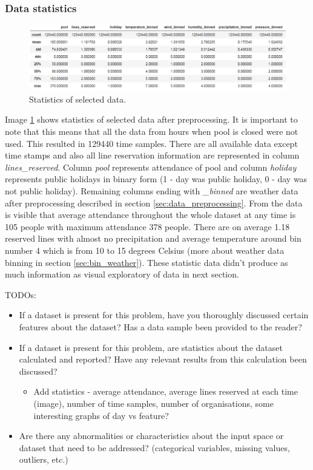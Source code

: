 \documentclass{article}
\begin{document}
\subsubsection{Data statistics}
\begin{figure}[h!]
\centering
\includegraphics[width=12cm]{imgs/stats.png}
\caption{Statistics of selected data.}
\label{fig:features_stats}
\end{figure}

Image \ref{fig:features_stats} shows statistics of selected data after preprocessing. It is important to note that this means that all the data from hours when pool is closed were not used. This resulted in 129440 time samples. There are all available data except time stamps and also all line reservation information are represented in column \emph{lines\_reserved}. Column \emph{pool} represents attendance of pool and column \emph{holiday} represents public holidays in binary form (1 - day was public holiday, 0 - day was not public holiday). Remaining columns ending with \emph{\_binned} are weather data after preprocessing described in section \ref{sec:data_preprocessing}. From the data is visible that average attendance throughout the whole dataset at any time is 105 people with maximum attendance 378 people. There are on average 1.18 reserved lines with almost no precipitation and average temperature around bin number 4 which is from 10 to 15 degrees Celsius (more about weather data binning in section \ref{sec:bin_weather}). These statistic data didn't produce as much information as visual exploratory of data in next section.

\color{red}
TODOs:
\begin{itemize}
    \item If a dataset is present for this problem, have you thoroughly discussed certain features about the dataset? Has a data sample been provided to the reader?
    \item If a dataset is present for this problem, are statistics about the dataset calculated and reported? Have any relevant results from this calculation been discussed?
        \begin{itemize}
        \item Add statistics - average attendance, average lines reserved at each time (image), number of time samples, number of organisations, some interesting graphs of day vs feature?
        \end{itemize}
    \item Are there any abnormalities or characteristics about the input space or dataset that need to be addressed? (categorical variables, missing values, outliers, etc.)
\end{itemize}
\color{black}
\end{document}
